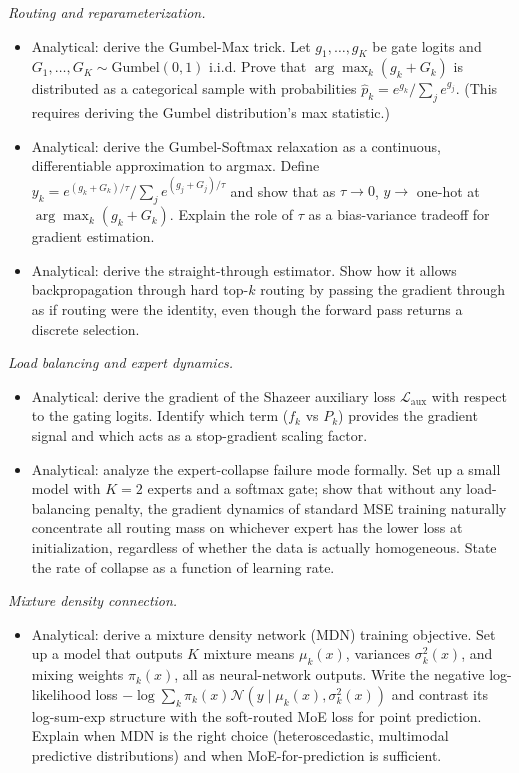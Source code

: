 \emph{Routing and reparameterization.}

\begin{itemize}
\tightlist
\item
  Analytical: derive the Gumbel-Max trick. Let \(g_1, \ldots, g_K\) be
  gate logits and \(G_1, \ldots, G_K \sim \text{Gumbel}(0, 1)\) i.i.d.
  Prove that \(\arg\max_k (g_k + G_k)\) is distributed as a categorical
  sample with probabilities \(\hat{p}_k = e^{g_k} / \sum_j e^{g_j}\).
  (This requires deriving the Gumbel distribution's max statistic.)
\item
  Analytical: derive the Gumbel-Softmax relaxation as a continuous,
  differentiable approximation to argmax. Define
  \(y_k = e^{(g_k + G_k)/\tau} / \sum_j e^{(g_j + G_j)/\tau}\) and show
  that as \(\tau \to 0\), \(y \to\) one-hot at
  \(\arg\max_k (g_k + G_k)\). Explain the role of \(\tau\) as a
  bias-variance tradeoff for gradient estimation.
\item
  Analytical: derive the straight-through estimator. Show how it allows
  backpropagation through hard top-\(k\) routing by passing the gradient
  through as if routing were the identity, even though the forward pass
  returns a discrete selection.
\end{itemize}

\emph{Load balancing and expert dynamics.}

\begin{itemize}
\tightlist
\item
  Analytical: derive the gradient of the Shazeer auxiliary loss
  \(\mathcal{L}_{\text{aux}}\) with respect to the gating logits.
  Identify which term (\(f_k\) vs \(P_k\)) provides the gradient signal
  and which acts as a stop-gradient scaling factor.
\item
  Analytical: analyze the expert-collapse failure mode formally. Set up
  a small model with \(K = 2\) experts and a softmax gate; show that
  without any load-balancing penalty, the gradient dynamics of standard
  MSE training naturally concentrate all routing mass on whichever
  expert has the lower loss at initialization, regardless of whether the
  data is actually homogeneous. State the rate of collapse as a function
  of learning rate.
\end{itemize}

\emph{Mixture density connection.}

\begin{itemize}
\tightlist
\item
  Analytical: derive a mixture density network (MDN) training objective.
  Set up a model that outputs \(K\) mixture means \(\mu_k(x)\),
  variances \(\sigma_k^2(x)\), and mixing weights \(\pi_k(x)\), all as
  neural-network outputs. Write the negative log-likelihood loss
  \(-\log \sum_k \pi_k(x) \mathcal{N}(y \mid \mu_k(x), \sigma_k^2(x))\)
  and contrast its log-sum-exp structure with the soft-routed MoE loss
  for point prediction. Explain when MDN is the right choice
  (heteroscedastic, multimodal predictive distributions) and when
  MoE-for-prediction is sufficient.
\end{itemize}

